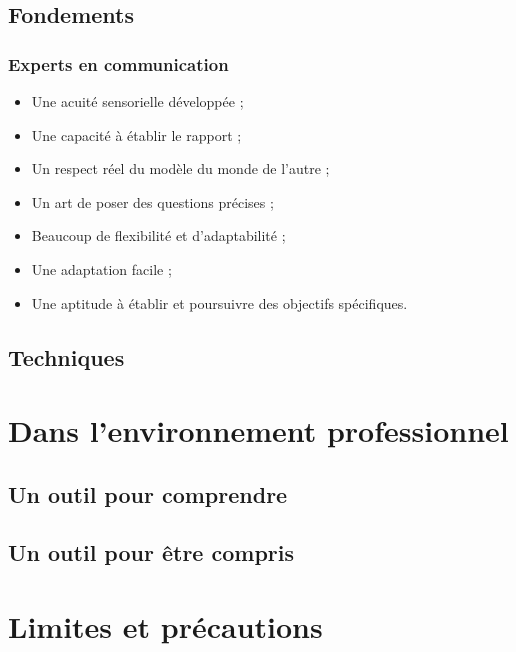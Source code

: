 \documentclass{beamer}
\begin{document}
\subsection{Fondements}
\begin{frame}[t]\frametitle{Experts en communication}
	\begin{itemize}
		\item<+-> Une acuité sensorielle développée ;
		\item<+-> Une capacité à établir le rapport ;
		\item<+-> Un respect réel du modèle du monde de l'autre ;
		\item<+-> Un art de poser des questions précises ;
		\item<+-> Beaucoup de flexibilité et d'adaptabilité ;
		\item<+-> Une adaptation facile ;
		\item<+-> Une aptitude à établir et poursuivre des objectifs spécifiques.
	\end{itemize}
\end{frame}
\subsection{Techniques}

\section{Dans l'environnement professionnel}
\subsection{Un outil pour comprendre}
\subsection{Un outil pour être compris}

\section{Limites et précautions}
\end{document}
